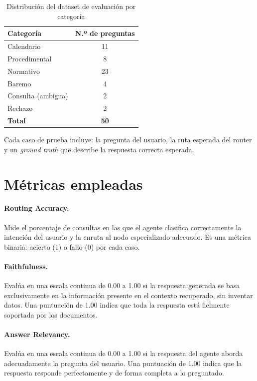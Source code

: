\documentclass[12pt,a4paper,oneside]{report}
\begin{document}
\begin{table}[H]
    \centering
    \caption{Distribución del dataset de evaluación por categoría}
    \begin{tabular}{@{}lc@{}}
        \toprule
        \textbf{Categoría} & \textbf{N.º de preguntas} \\
        \midrule
        Calendario         & 11                        \\
        Procedimental      & 8                         \\
        Normativo          & 23                        \\
        Baremo             & 4                         \\
        Consulta (ambigua) & 2                         \\
        Rechazo            & 2                         \\
        \midrule
        \textbf{Total}     & \textbf{50}               \\
        \bottomrule
    \end{tabular}
\end{table}

Cada caso de prueba incluye: la pregunta del usuario, la ruta esperada del router y un \textit{ground truth} que describe la respuesta correcta esperada.

\section{Métricas empleadas}
\paragraph{Routing Accuracy.} Mide el porcentaje de consultas en las que el agente clasifica correctamente la intención del usuario y la enruta al nodo especializado adecuado. Es una métrica binaria: acierto (1) o fallo (0) por cada caso.

\paragraph{Faithfulness.} Evalúa en una escala continua de 0.00 a 1.00 si la respuesta generada se basa exclusivamente en la información presente en el contexto recuperado, sin inventar datos. Una puntuación de 1.00 indica que toda la respuesta está fielmente soportada por los documentos.

\paragraph{Answer Relevancy.} Evalúa en una escala continua de 0.00 a 1.00 si la respuesta del agente aborda adecuadamente la pregunta del usuario. Una puntuación de 1.00 indica que la respuesta responde perfectamente y de forma completa a lo preguntado.
\end{document}
